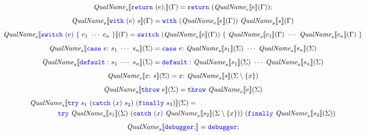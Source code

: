 \documentclass[a4paper]{article}
\newcommand{\code}[1]{\textcolor{blue}{\tt #1}}
\newcommand{\QualName}{\emph{QualName}}
\begin{document}
\begin{equation*}
\QualName_s \llbracket \code{return}\ (e)\code{;} \rrbracket (\Gamma) = \code{return}\ (\QualName_e \llbracket e \rrbracket (\Gamma))\code{;}
\end{equation*}
\begin{equation*}
\QualName_s \llbracket \code{with}\ \code{(}e\code{)}\ s \rrbracket (\Gamma) = \code{with}\ \code{(}\QualName_e \llbracket e \rrbracket (\Gamma)\code{)}\ \QualName_s \llbracket s \rrbracket (\Gamma)
\end{equation*}
\begin{equation*}
\QualName_s \llbracket \code{switch}\ \code{(}e\code{)}\ \code{\{}\ c_1\ \cdots\ c_n\ \code{\}} \rrbracket (\Gamma) = \code{switch}\ \code{(}\QualName_e \llbracket e \rrbracket (\Gamma)\code{)}\ \code{\{}\ \QualName_s \llbracket c_1 \rrbracket (\Gamma)\ \cdots\ \QualName_s \llbracket c_n \rrbracket (\Gamma)\ \code{\}}
\end{equation*}
\begin{equation*}
\QualName_s \llbracket \code{case}\ e\code{:}\ s_1\ \cdots\ s_n \rrbracket (\Sigma) = \code{case}\ e\code{:}\ \QualName_s \llbracket s_1 \rrbracket (\Sigma)\ \cdots\ \QualName_s \llbracket s_n \rrbracket (\Sigma)
\end{equation*}
\begin{equation*}
\QualName_s \llbracket \code{default:}\ s_1\ \cdots\ s_n \rrbracket (\Sigma) = \code{default:}\ \QualName_s \llbracket s_1 \rrbracket (\Sigma)\ \cdots\ \QualName_s \llbracket s_n \rrbracket (\Sigma)
\end{equation*}
\begin{equation*}
\QualName_s \llbracket x\code{:}\ s \rrbracket (\Sigma) = x\code{:}\ \QualName_s \llbracket s \rrbracket (\Sigma \setminus \{x\})
\end{equation*}
\begin{equation*}
\QualName_s \llbracket \code{throw}\ e \rrbracket (\Sigma) = \code{throw}\ \QualName_e \llbracket e \rrbracket (\Sigma)
\end{equation*}
\begin{equation*}
\begin{split}
&\QualName_s \llbracket \code{try}\ s_1\ (\code{catch}\ \code{(}x\code{)}\ s_2)\ (\code{finally}\ s_3) \rrbracket (\Sigma) = \\
&\qquad\qquad\code{try}\ \QualName_s \llbracket s_1 \rrbracket (\Sigma)\ (\code{catch}\ \code{(}x\code{)}\ \QualName_s \llbracket s_2 \rrbracket (\Sigma \setminus \{x\}))\ (\code{finally}\ \QualName_s \llbracket s_3 \rrbracket (\Sigma))
\end{split}
\end{equation*}
\begin{equation*}
\QualName_s \llbracket \code{debugger;} \rrbracket = \code{debugger;}
\end{equation*}
\end{document}
